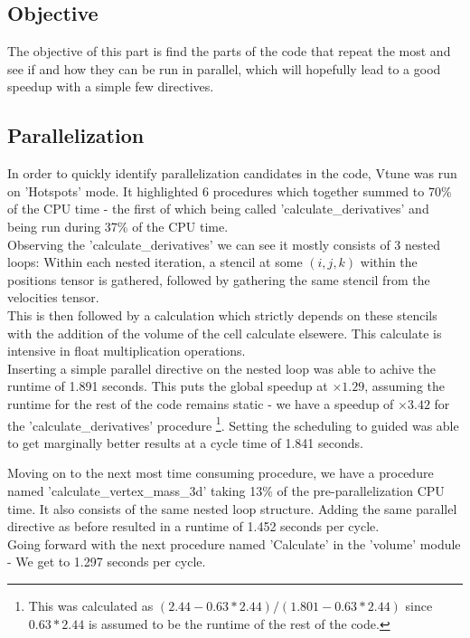 \subsection*{Objective}
The objective of this part is find the parts of the code
that repeat the most and see if and how they can be run in parallel,
which will hopefully lead to a good speedup with a simple few directives.

\subsection*{Parallelization}
In order to quickly identify parallelization
candidates in the code, Vtune was run
on 'Hotspots' mode.
It highlighted 6 procedures which together
summed to 70\% of the CPU time
- the first of which being called 'calculate\_derivatives' and
being run during 37\% of the CPU time.\\

Observing the 'calculate\_derivatives' we can see
it mostly consists of 3 nested loops:
Within each nested iteration, a stencil at some
$(i,j,k)$ within the positions tensor is gathered,
followed by gathering the same stencil from 
the velocities tensor.\\
This is then followed by a calculation 
which strictly depends on these stencils with the 
addition of the volume of the cell calculate elsewere.
This calculate is intensive in float multiplication operations.\\

Inserting a simple parallel directive on the nested
loop was able to achive the runtime of 1.891 seconds.
This puts the global speedup at $\times 1.29$,
assuming the runtime for the rest of the code remains
static - we have a speedup of $\times 3.42$ 
for the 'calculate\_derivatives' procedure
\footnote{
    This was calculated as $(2.44-0.63*2.44)/(1.801-0.63*2.44)$
    since $0.63*2.44$ is assumed to be the runtime of the rest of
    the code.
}.
Setting the scheduling to guided was able to get
marginally better results at a cycle time of 1.841 seconds.

Moving on to the next most time consuming procedure,
we have a procedure named 'calculate\_vertex\_mass\_3d'
taking 13\% of the pre-parallelization CPU time. It also
consists of the same nested loop structure.
Adding the same parallel directive as before
resulted in a runtime of 1.452 seconds per cycle.\\

Going forward with the next procedure named 'Calculate' in the
'volume' module - We get to 1.297 seconds per cycle.

